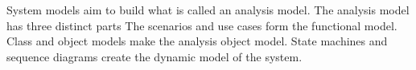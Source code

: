 System models aim to build what is called an analysis model.
The analysis model has three distinct parts
The scenarios and use cases form the functional model.
Class and object models make the analysis object model.
State machines and sequence diagrams create the dynamic model of the system.  \cite{book:bruegge}









